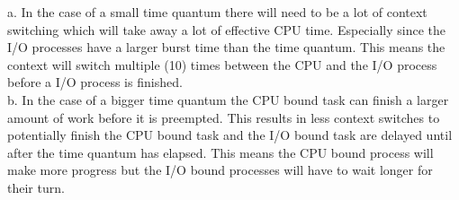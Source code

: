 \documentclass[]{article}
\begin{document}
a. In the case of a small time quantum there will need to be a lot of context switching which will take away a lot of effective CPU time. Especially since the I/O processes have a larger burst time than the time quantum. This means the context will switch multiple (10) times between the CPU and the I/O process before a I/O process is finished.\\
b. In the case of a bigger time quantum the CPU bound task can finish a larger amount of work before it is preempted. This results in less context switches to potentially finish the CPU bound task and the I/O bound task are delayed until after the time quantum has elapsed. This means the CPU bound process will make more progress but the I/O bound processes will have to wait longer for their turn.\\
\end{document}
